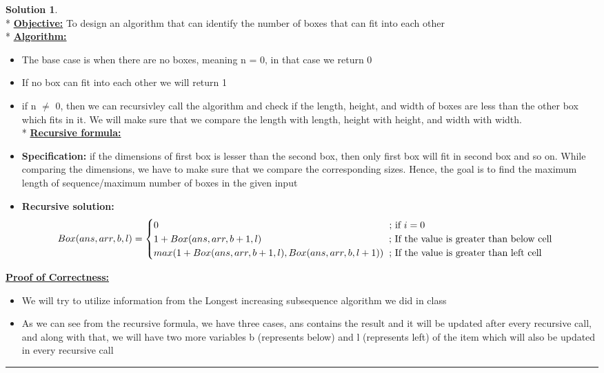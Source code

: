\documentclass{article}
\theoremstyle{definition}
\def\fline{\rule{0.75\linewidth}{0.5pt}}
\newcommand{\finishline}{\vspace{-15pt}\begin{center}\fline\end{center}}
\newtheorem*{solution*}{Solution}
\newenvironment{solution}{\begin{solution*}}{{\finishline} \end{solution*}}
\begin{document}
\begin{solution}
\hfill \bigskip\\*
	\textbf{\underline{Objective:}} To design an algorithm that can identify the number of boxes that can fit into each other \bigskip\\*
	\textbf{\underline{Algorithm:}}
	\begin{itemize}
		\item The base case is when there are no boxes, meaning n = 0, in that case we return 0
		\item If no box can fit into each other we will return 1
		\item if n $\neq$ 0, then we can  recursivley call the algorithm and check if the length, height, and width of boxes are less than the other box which fits in it. We will make sure that we compare the length with length, height with height, and width with width. \bigskip\\*
	\textbf{\underline{Recursive formula:}}
		\item{\textbf{Specification:}} if the dimensions of first box is lesser than the second box, then only first box will fit in second box and so on. While comparing the dimensions, we have to make sure that we compare the corresponding sizes. Hence, the goal is to find the maximum length of sequence/maximum number of boxes in the given input
	\item{\textbf{Recursive solution:}} 
	\begin{equation}
		Box(ans, arr, b, l) = 
			\begin{cases}
				0 \qquad \qquad \qquad \qquad \qquad \qquad\qquad  \text{\hspace{3.5cm}; if } i = 0 \\
				1 + Box(ans, arr, b + 1, l)  \hspace{4.65cm} \text{; If the value is greater than below cell} \\
				 max(1 + Box(ans, arr, b + 1, l), Box(ans, arr, b, l + 1)) \hspace{0.2cm} \text{; If the value is greater than left cell} \\
			\end{cases}
		\end{equation}
	\end{itemize} 
\textbf{\underline{Proof of Correctness:}}
	\begin{itemize}
		\item We will try to utilize information from the Longest increasing subsequence algorithm we did in class
		\item As we can see from the recursive formula, we have three cases, ans contains the result and it will be updated after every recursive call, and along with that, we will have two more variables b (represents below) and l (represents left) of the item which will also be updated in every recursive call

\end{itemize}
\end{solution}
\end{document}
